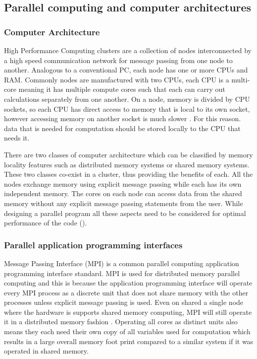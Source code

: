 \documentclass[preprint,11pt,authoryear]{elsarticle}
\begin{document}
\subsection{Parallel computing and computer architectures}
\subsubsection{Computer Architecture}
High Performance Computing clusters are a collection of nodes interconnected by a high speed 
communication network for message passing from one node to another. Analogous to a conventional 
PC, each node has one or more CPUs and RAM. Commonly nodes are manufactured with two CPUs, each CPU 
is a multi-core meaning it has multiple compute cores such that each can carry out calculations 
separately from one another. On a node, memory is divided by CPU sockets, so each CPU has direct 
access to memory that is local to its own socket, however accessing memory on another socket 
is much slower \cite{Jin2011}. For this reason. data that is needed for computation should 
be stored locally to the CPU that needs it.  

There are two classes of computer architecture which can be classified by memory locality features such as 
distributed memory systems or shared memory systems. These two classes co-exist in a cluster, 
thus providing the benefits of each. All the nodes exchange memory using explicit message passing 
while each has its own independent memory. The cores on each node can access data from the 
shared memory without any explicit message passing statements from the user. While designing a 
parallel program all these aspects need to be considered for optimal performance of the code 
(\cite{Adhianto2007}).


\subsubsection{Parallel application programming interfaces}
Message Passing Interface (MPI) is a common parallel computing application 
programming interface standard. MPI is used for distributed memory parallel computing and this is 
because the application programming interface will operate 
every MPI process as a discrete unit that does not share memory with the other processes unless explicit 
message passing is used. Even on shared a single node where the hardware is supports shared 
memory computing, MPI will still operate it in a distributed memory fashion \citep{Jin2011}. Operating all 
cores as distinct units also means they each need their own copy of all variables used for computation 
which results in a large overall memory foot print compared to a similar system if it was operated in 
shared memory. 
\end{document}

